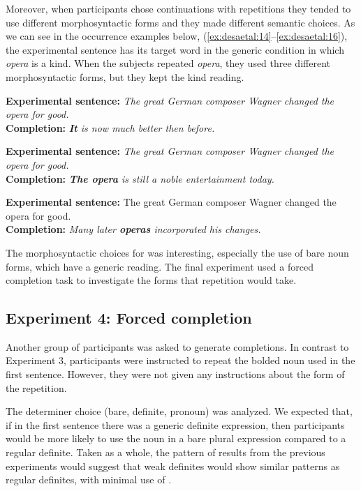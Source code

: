 \documentclass[output=paper,
modfonts
]{langscibook}
\begin{document}
Moreover, when participants chose continuations with repetitions they tended to use different morphosyntactic forms and they made different semantic choices. As we can see in the occurrence examples below, (\ref{ex:desaetal:14}--\ref{ex:desaetal:16}), the experimental sentence has its target word in the generic condition in which \textit{opera} is a kind. When the subjects repeated \textit{opera}, they used three different morphosyntactic forms, but they kept the kind reading.

\ea \label{ex:desaetal:14}
\textbf{Experimental sentence:} \textit{The great German composer Wagner changed the opera for good.}
\\ \textbf{Completion:} \textit{\textbf{It} is now much better then before.}
\z

\ea \label{ex:desaetal:15}
\textbf{Experimental sentence:} \textit{The great German composer Wagner changed the opera for good.}
\\ \textbf{Completion:} \textit{\textbf{The opera} is still a noble entertainment today.}
\z

\ea \label{ex:desaetal:16}
\textbf{Experimental sentence:} The great German composer Wagner changed the opera for good.	
\\  \textbf{Completion:} \textit{Many later \textbf{operas} incorporated his changes.} 
\z

The morphosyntactic choices for  was interesting, especially the use of bare noun forms, which have a generic reading. The final experiment used a forced completion task to investigate the forms that repetition would take.


\subsection{Experiment 4: Forced completion} 
Another group of participants was asked to generate completions. In contrast to Experiment 3,  participants were instructed to repeat the bolded noun used in the first sentence. However, they were not given any instructions about the form of the repetition. 

The determiner choice (bare, definite, pronoun) was analyzed. We expected that, if in the first sentence there was a generic definite expression, then participants would be more likely to use the noun in a bare plural expression compared to a regular definite. Taken as a whole, the pattern of results from the previous experiments would suggest that weak definites would show similar patterns as regular definites, with minimal use of .
\end{document}
